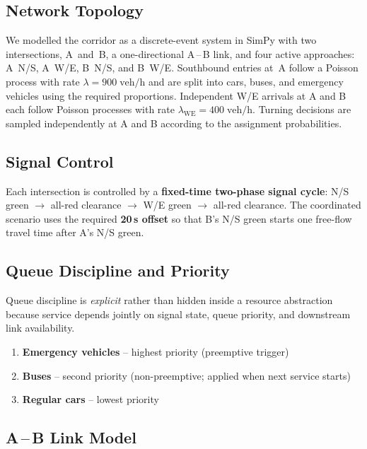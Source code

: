 \documentclass[11pt,a4paper]{article}
\begin{document}
\subsection{Network Topology}

We modelled the corridor as a discrete-event system in SimPy with two intersections, A~and~B, a one-directional A\,--\,B link, and four active approaches: A~N/S, A~W/E, B~N/S, and B~W/E. Southbound entries at~A follow a Poisson process with rate $\lambda = 900\;\text{veh/h}$ and are split into cars, buses, and emergency vehicles using the required proportions. Independent W/E arrivals at A and B each follow Poisson processes with rate $\lambda_{\mathrm{WE}} = 400\;\text{veh/h}$. Turning decisions are sampled independently at A and B according to the assignment probabilities.

\subsection{Signal Control}

Each intersection is controlled by a \textbf{fixed-time two-phase signal cycle}: N/S green $\rightarrow$ all-red clearance $\rightarrow$ W/E green $\rightarrow$ all-red clearance. The coordinated scenario uses the required \textbf{20\,s offset} so that B's N/S green starts one free-flow travel time after A's N/S green.

\subsection{Queue Discipline and Priority}

Queue discipline is \emph{explicit} rather than hidden inside a resource abstraction because service depends jointly on signal state, queue priority, and downstream link availability.

\begin{infobox}
\begin{enumerate}[leftmargin=1.2em,itemsep=2pt]
  \item \textbf{Emergency vehicles} -- highest priority (preemptive trigger)
  \item \textbf{Buses} -- second priority (non-preemptive; applied when next service starts)
  \item \textbf{Regular cars} -- lowest priority
\end{enumerate}
\end{infobox}

\subsection{A\,--\,B Link Model}
\end{document}
